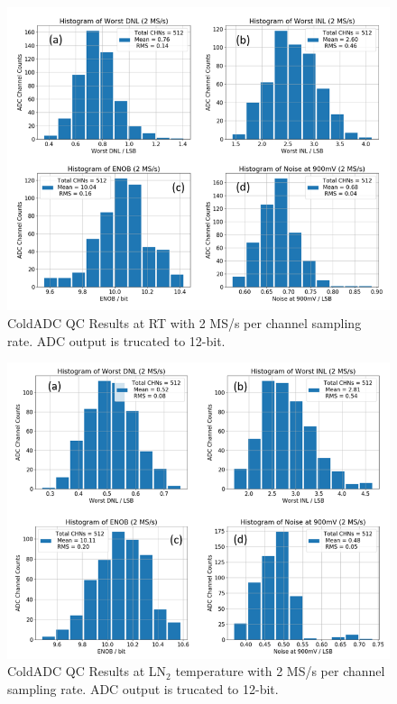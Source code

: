 \begin{figure}[h!]
\centering
  \includegraphics[width=0.85\linewidth]{figures/qc_lin2Mwarm.png}
  \caption{ColdADC QC Results at RT with 2 MS/s per channel sampling rate. ADC output is trucated to 12-bit.}
  \label{fig:qc_lin2Mwarm}
\end{figure}
\begin{figure}[h!]
\centering
  \includegraphics[width=0.85\linewidth]{figures/qc_lin2Mcold.png}
  \caption{ColdADC QC Results at LN$_2$ temperature with 2 MS/s per channel sampling rate. ADC output is trucated to 12-bit.}
  \label{fig:qc_lin2Mcold}
\end{figure}



